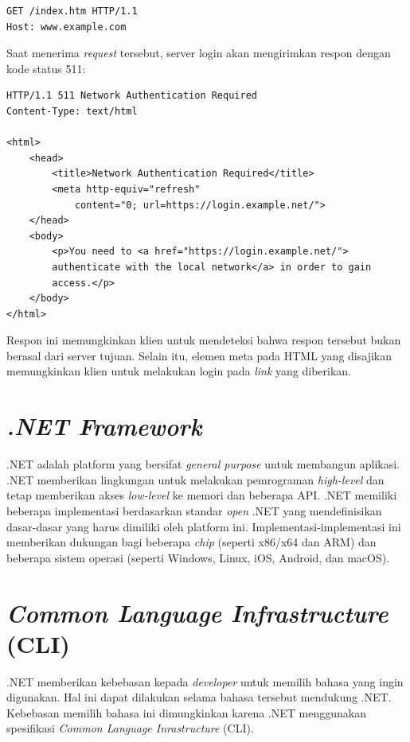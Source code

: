 \begin{lstlisting}
GET /index.htm HTTP/1.1
Host: www.example.com
\end{lstlisting}

Saat menerima \textit{request} tersebut, server login akan mengirimkan respon dengan kode status 511:

\begin{lstlisting}
HTTP/1.1 511 Network Authentication Required
Content-Type: text/html

<html>
    <head>
        <title>Network Authentication Required</title>
        <meta http-equiv="refresh"
            content="0; url=https://login.example.net/">
    </head>
    <body>
        <p>You need to <a href="https://login.example.net/">
        authenticate with the local network</a> in order to gain
        access.</p>
    </body>
</html>
\end{lstlisting}

Respon ini memungkinkan klien untuk mendeteksi bahwa respon tersebut bukan berasal dari server tujuan. Selain itu, elemen meta pada HTML yang disajikan memungkinkan klien untuk melakukan login pada \textit{link} yang diberikan.



\section{\textit{.NET Framework}}
\label{sec:net_framework}

.NET adalah platform yang bersifat \textit{general purpose} untuk membangun aplikasi\cite{NET_PRIMER:2016}. .NET memberikan lingkungan untuk melakukan pemrograman \textit{high-level} dan tetap memberikan akses \textit{low-level} ke memori dan beberapa API. .NET memiliki beberapa implementasi berdasarkan standar \textit{open} .NET yang mendefinisikan dasar-dasar yang harus dimiliki oleh platform ini. Implementasi-implementasi ini memberikan dukungan bagi beberapa \textit{chip} (seperti x86/x64 dan ARM) dan beberapa sistem operasi (seperti Windows, Linux, iOS, Android, dan macOS).



\section{\textit{Common Language Infrastructure} (CLI)}
\label{sec:cli}

.NET memberikan kebebasan kepada \textit{developer} untuk memilih bahasa yang ingin digunakan. Hal ini dapat dilakukan selama bahasa tersebut mendukung .NET. Kebebasan memilih bahasa ini dimungkinkan karena .NET menggunakan spesifikasi \textit{Common Language Inrastructure} (CLI).


